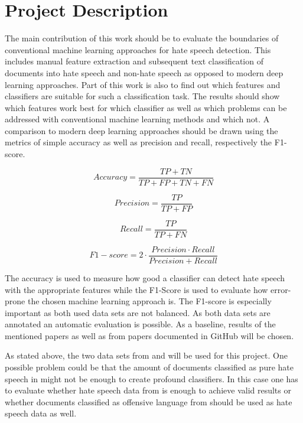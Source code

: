 \section{Project Description}
\label{section:description}

The main contribution of this work should be to evaluate the boundaries of conventional machine learning approaches for hate speech detection. This includes manual feature extraction and subsequent text classification of doc\-u\-ments into hate speech and non-hate speech as opposed to modern deep learning approaches. Part of this work is also to find out which features and classifiers are suitable for such a classification task. The results should show which features work best for which classifier as well as which problems can be addressed with conventional machine learning methods and which not. A comparison to modern deep learning approaches should be drawn using the metrics of simple accuracy as well as precision and recall, respectively the F1-score. 

\begin{equation}
Accuracy = \frac{TP + TN}{TP + FP + TN + FN}
\end{equation}

\begin{equation}
Precision = \frac{TP}{TP + FP}
\end{equation}

\begin{equation}
Recall = \frac{TP}{TP + FN}
\end{equation}

\begin{equation}
F1-score = 2 \cdot \frac{Precision \cdot Recall}{Precision + Recall}
\end{equation}

The accuracy is used to measure how good a classifier can detect hate speech with the appropriate features while the F1-Score is used to evaluate how error-prone the chosen machine learning approach is. The F1-score is especially important as both used data sets are not balanced. As both data sets are annotated an automatic evaluation is possible. As a baseline, results of the mentioned papers as well as from papers documented in GitHub will be chosen. 

As stated above, the two data sets from \cite{ThomasDavidson.2020} and \cite{OnadeGibert.2020} will be used for this project. One possible problem could be that the amount of documents classified as pure hate speech in \cite{ThomasDavidson.2020} might not be enough to create profound classifiers. In this case one has to evaluate whether hate speech data from \cite{OnadeGibert.2020} is enough to achieve valid results or whether documents classified as offensive language from \cite{ThomasDavidson.2020} should be used as hate speech data as well. 

